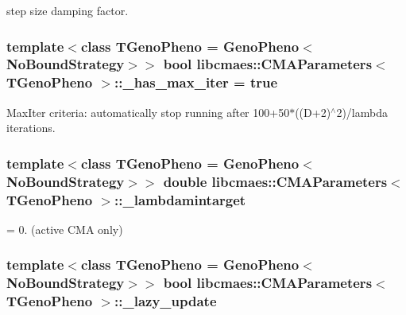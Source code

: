 step size damping factor. \hypertarget{classlibcmaes_1_1CMAParameters_a9a66e6d8cf1e1c67cd9c43d5c87a71d1}{
\subsubsection[{\-\_\-has\-\_\-max\-\_\-iter}]{\setlength{\rightskip}{0pt plus 5cm}template$<$class T\-Geno\-Pheno = Geno\-Pheno$<$\-No\-Bound\-Strategy$>$$>$ bool {\bf libcmaes\-::\-C\-M\-A\-Parameters}$<$ T\-Geno\-Pheno $>$\-::\-\_\-has\-\_\-max\-\_\-iter = true}}\label{classlibcmaes_1_1CMAParameters_a9a66e6d8cf1e1c67cd9c43d5c87a71d1}
Max\-Iter criteria\-: automatically stop running after 100+50$\ast$((D+2)$^\wedge$2)/lambda iterations. \hypertarget{classlibcmaes_1_1CMAParameters_afc8800d362e2b25074610b883684156b}{
\subsubsection[{\-\_\-lambdamintarget}]{\setlength{\rightskip}{0pt plus 5cm}template$<$class T\-Geno\-Pheno = Geno\-Pheno$<$\-No\-Bound\-Strategy$>$$>$ double {\bf libcmaes\-::\-C\-M\-A\-Parameters}$<$ T\-Geno\-Pheno $>$\-::\-\_\-lambdamintarget}}\label{classlibcmaes_1_1CMAParameters_afc8800d362e2b25074610b883684156b}
= 0. (active C\-M\-A only) \hypertarget{classlibcmaes_1_1CMAParameters_ac65bf2bb1b20461cfe8bd58175727ccc}{
\subsubsection[{\-\_\-lazy\-\_\-update}]{\setlength{\rightskip}{0pt plus 5cm}template$<$class T\-Geno\-Pheno = Geno\-Pheno$<$\-No\-Bound\-Strategy$>$$>$ bool {\bf libcmaes\-::\-C\-M\-A\-Parameters}$<$ T\-Geno\-Pheno $>$\-::\-\_\-lazy\-\_\-update}}\label{classlibcmaes_1_1CMAParameters_ac65bf2bb1b20461cfe8bd58175727ccc}
